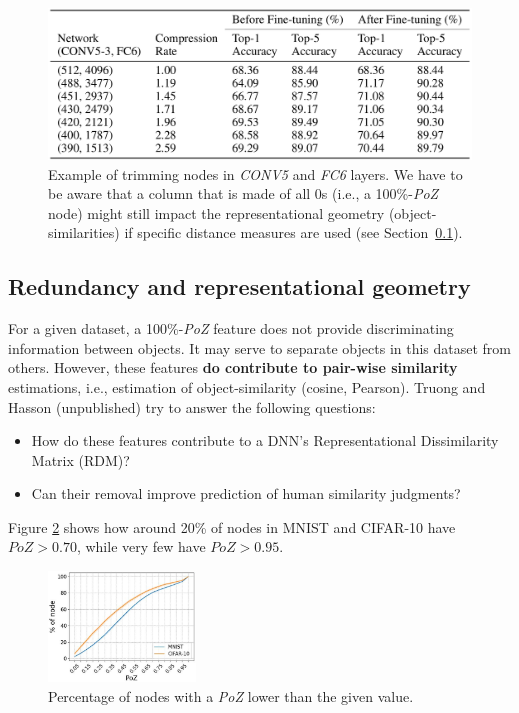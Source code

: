 \begin{figure}[!ht]
    \centering
    \captionsetup{width=.8\linewidth}
    \includegraphics[width=0.65\linewidth]{images/trimming.png}
    \caption*{Example of trimming nodes in \textit{CONV5} and \textit{FC6} layers. We have to be aware that a column that is made of all 0s (i.e., a 100\%-\textit{PoZ} node) might still impact the representational geometry (object-similarities) if specific distance measures are used (see Section~\ref{sec:redundancy}).}
    \label{fig:trimming}
\end{figure}

\subsection{Redundancy and representational geometry}
\label{sec:redundancy}
For a given dataset, a 100\%-\textit{PoZ} feature does not provide discriminating information between objects. It may  serve to separate objects in this dataset from others. However, these features \textbf{do contribute to pair-wise similarity} estimations, i.e., estimation of object-similarity (cosine, Pearson).
Truong and Hasson (unpublished) try to answer the following questions:
\begin{itemize}
    \item How do these features contribute to a DNN's  Representational Dissimilarity Matrix (RDM)? 
    \item Can their removal improve prediction of human similarity judgments?
\end{itemize}

Figure \ref{fig:poz} shows how around 20\% of nodes in MNIST and CIFAR-10 have $PoZ>0.70$, while very few have $PoZ>0.95$.\\

\begin{figure}
  \centering
  \includegraphics[width=0.35\textwidth]{images/poz.png}
  \caption{Percentage of nodes with a \textit{PoZ} lower than the given value.}
  \label{fig:poz}
\end{figure}

